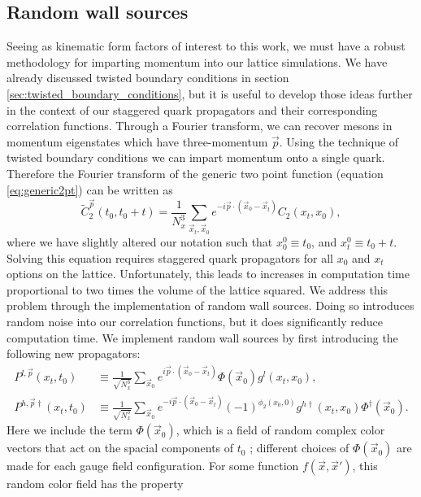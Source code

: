 \subsection{Random wall sources}\label{sec:random_wall_sources}
Seeing as kinematic form factors of interest to this work, we must have a robust methodology for imparting momentum into our lattice simulations.  We have already discussed twisted boundary conditions \cite{SACHRAJDA200573} in section \ref{sec:twisted_boundary_conditions}, but it is useful to develop those ideas further in the context of our staggered quark propagators and their corresponding correlation functions.  Through a Fourier transform, we can recover mesons in momentum eigenstates which have three-momentum $\vec{p}$.  Using the technique of twisted boundary conditions we can impart momentum onto a single quark. Therefore the Fourier transform of the generic two point function (equation \ref{eq:generic2pt}) can be written as
\begin{equation}\label{eq:2pt_fourier}
\tilde{C}^{\vec{p}}_2(t_0,t_0+t) = \frac{1}{N^3_x} \sum_{\vec{x}_t, \vec{x}_0} e^{-i\vec{p}\cdot(\vec{x}_0-\vec{x}_t)}C_2(x_t,x_0),
\end{equation}
where we have slightly altered our notation such that $x^0_0\equiv t_0  $, and $x^0_t \equiv t_0+t$.  Solving this equation requires staggered quark propagators for all $x_0$ and $x_t$ options on the lattice. Unfortunately, this leads to increases in computation time proportional to two times the volume of the lattice squared.  We address this problem through the implementation of random wall sources.  Doing so introduces random noise into our correlation functions, but it does significantly reduce computation time.  We implement random wall sources by first introducing the following new propagators:
\begin{align}\label{eq:new_prop_light}
    P^{l,\vec{p}}(x_t,t_0) &\equiv \frac{1}{\sqrt{N^3_x}} \sum_{\vec{x}_0} e^{i\vec{p}\cdot(\vec{x}_0-\vec{x}_t)}\Phi(\vec{x}_0) g^l(x_t,x_0),\\ \label{eq:new_prop_heavy}
    P^{h,\vec{p}\dagger}(x_t,t_0) &\equiv \frac{1}{\sqrt{N^3_x}} \sum_{\vec{x}_0} e^{-i\vec{p}\cdot(\vec{x}_0-\vec{x}_t)} (-1)^{\phi_2(x_0,0)} g^{h\dagger}(x_t,x_0) \Phi^\dagger(\vec{x}_0).
\end{align}
Here we include the term $\Phi(\vec{x}_0)$, which is a field of random complex color vectors that act on the spacial components of $t_0$ \cite{PhysRevD.59.074503, PhysRevD.73.074506}; different choices of $\Phi(\vec{x}_0)$ are made for each gauge field configuration.  For some function $f(\vec{x}, \vec{x}')$, this random color field has the property
